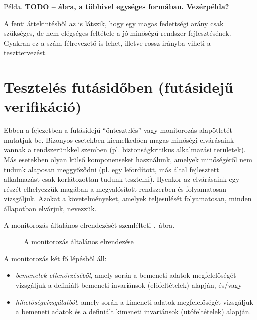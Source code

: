 \begin{megjegyzes}
Példa. \textbf{TODO -- ábra, a többivel egységes formában. Vezérpélda?}
\end{megjegyzes}

A fenti áttekintésből az is látszik, hogy egy magas fedettségi arány csak szükséges, de nem elégséges feltétele a jó minőségű rendszer fejlesztésének. Gyakran ez a szám félrevezető is lehet, illetve rossz irányba viheti a teszttervezést.


\section{Tesztelés futásidőben (futásidejű verifikáció)}\label{sec:futasideju-verifikacio}
Ebben a fejezetben a futásidejű ``öntesztelés'' vagy monitorozás alapötletét mutatjuk be. Bizonyos esetekben kiemelkedően magas minőségi elvárásaink vannak a rendszerünkkel szemben (pl. biztonságkritikus alkalmazási területek). Más esetekben olyan külső komponenseket használunk, amelyek minőségéről nem tudunk alaposan meggyőződni (pl. egy lefordított, más által fejlesztett alkalmazást csak korlátozottan tudunk tesztelni). Ilyenkor az elvárásaink egy részét elhelyezzük magában a megvalósított rendszerben és folyamatosan vizsgáljuk. Azokat a követelményeket, amelyek teljesülését folyamatosan, minden állapotban elvárjuk,  nevezzük.

A monitorozás általános elrendezését szemlélteti .~ábra.

\begin{figure}[h]
	\centering
	
	
	\caption{A monitorozás általános elrendezése}
	\label{fig:monitorozas-elrendezes}
\end{figure}

A monitorozás két fő lépésből áll:
\begin{itemize}
\item \emph{bemenetek ellenőrzéséből}, amely során a bemeneti adatok megfelelőségét vizsgáljuk a definiált bemeneti invariánsok (előfeltételek) alapján, és/vagy
\item \emph{hihetőségvizsgálatból}, amely során a kimeneti adatok megfelelőségét vizsgáljuk a bemeneti adatok és a definiált kimeneti invariánsok (utófeltételek) alapján.
\end{itemize}

